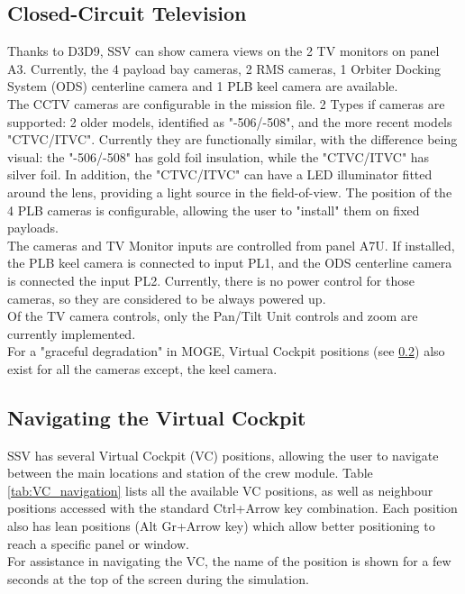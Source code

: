 \documentclass[Space_Shuttle_Vessel_Manual.tex]{subfiles}
\begin{document}
\begin{multicols*}{2}
\subsection{Closed-Circuit Television}
Thanks to D3D9, SSV can show camera views on the 2 TV monitors on panel A3. Currently, the 4 payload bay cameras, 2 RMS cameras, 1 Orbiter Docking System (ODS) centerline camera and 1 PLB keel camera are available.\\
The CCTV cameras are configurable in the mission file. 2 Types if cameras are supported: 2 older models, identified as "-506/-508", and the more recent models "CTVC/ITVC". Currently they are functionally similar, with the difference being visual: the "-506/-508" has gold foil insulation, while the "CTVC/ITVC" has silver foil. In addition, the "CTVC/ITVC" can have a LED illuminator fitted around the lens, providing a light source in the field-of-view. The position of the 4 PLB cameras is configurable, allowing the user to "install" them on fixed payloads.\\
The cameras and TV Monitor inputs are controlled from panel A7U. If installed, the PLB keel camera is connected to input PL1, and the ODS centerline camera is connected the input PL2. Currently, there is no power control for those cameras, so they are considered to be always powered up.\\
Of the TV camera controls, only the Pan/Tilt Unit controls and zoom are currently implemented.\\
For a "graceful degradation" in MOGE, Virtual Cockpit positions (see \ref{sec:nav-vc}) also exist for all the cameras except, the keel camera.



\subsection{Navigating the Virtual Cockpit}
\label{sec:nav-vc}
SSV has several Virtual Cockpit (VC) positions, allowing the user to navigate between the main locations and station of the crew module. Table \ref{tab:VC_navigation} lists all the available VC positions, as well as neighbour positions accessed with the standard Ctrl+Arrow key combination. Each position also has lean positions (Alt Gr+Arrow key) which allow better positioning to reach a specific panel or window.\\
For assistance in navigating the VC, the name of the position is shown for a few seconds at the top of the screen during the simulation.
\\

\end{multicols*}
\end{document}
